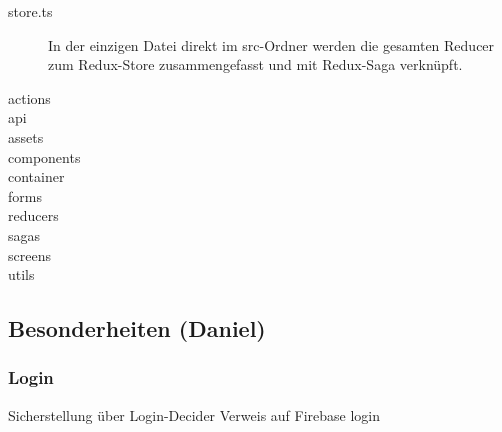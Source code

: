 \begin{description}
    \item[store.ts]
    In der einzigen Datei direkt im src-Ordner werden die gesamten Reducer zum Redux-Store zusammengefasst und mit
    Redux-Saga verknüpft.
    \item[actions]

    \item[api]
    \item[assets]
    \item[components]
    \item[container]
    \item[forms]
    \item[reducers]
    \item[sagas]
    \item[screens]
    \item[utils]
\end{description}




\subsection{Besonderheiten (Daniel)}
\subsubsection{Login}
Sicherstellung über Login-Decider
Verweis auf Firebase login

